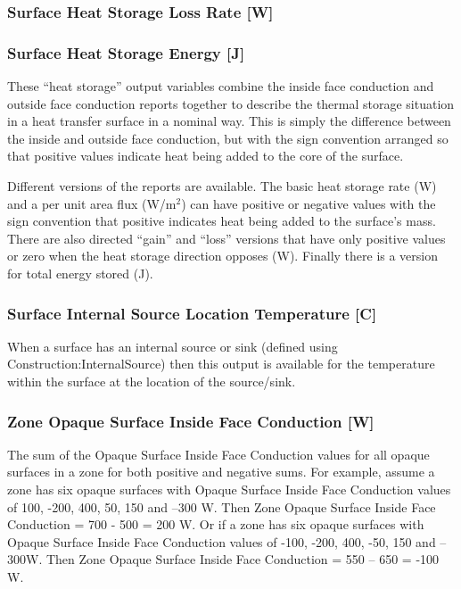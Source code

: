 \subsubsection{Surface Heat Storage Loss Rate {[}W{]}}\label{surface-heat-storage-loss-rate-w}

\subsubsection{Surface Heat Storage Energy {[}J{]}}\label{surface-heat-storage-energy-j}

These ``heat storage'' output variables combine the inside face conduction and outside face conduction reports together to describe the thermal storage situation in a heat transfer surface in a nominal way. This is simply the difference between the inside and outside face conduction, but with the sign convention arranged so that positive values indicate heat being added to the core of the surface.

Different versions of the reports are available. The basic heat storage rate (W) and a per unit area flux (W/m\(^{2}\)) can have positive or negative values with the sign convention that positive indicates heat being added to the surface's mass. There are also directed ``gain'' and ``loss'' versions that have only positive values or zero when the heat storage direction opposes (W). Finally there is a version for total energy stored (J).

\subsubsection{Surface Internal Source Location Temperature {[}C{]}}\label{surface-internal-source-location-temperature-c}

When a surface has an internal source or sink (defined using Construction:InternalSource) then this output is available for the temperature within the surface at the location of the source/sink.

\subsubsection{Zone Opaque Surface Inside Face Conduction {[}W{]}}\label{zone-opaque-surface-inside-face-conduction-w}

The sum of the Opaque Surface Inside Face Conduction values for all opaque surfaces in a zone for both positive and negative sums. For example, assume a zone has six opaque surfaces with Opaque Surface Inside Face Conduction values of 100, -200, 400, 50, 150 and --300 W. Then Zone Opaque Surface Inside Face Conduction = 700 - 500 = 200 W. Or if a zone has six opaque surfaces with Opaque Surface Inside Face Conduction values of -100, -200, 400, -50, 150 and --300W. Then Zone Opaque Surface Inside Face Conduction = 550 -- 650 = -100 W.

